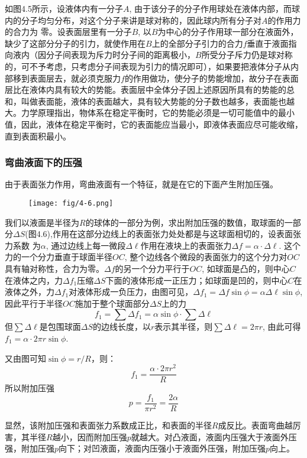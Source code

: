 如图4.5所示，设液体内有一分子$A$, 由于该分子的分子作用球处在液体内部，而球内的分子均匀分布，对这个分子来讲是球对称的，因此球内所有分子对$A$的作用力的合力为
零。设表面层里有一分子$B$, 以$B$为中心的分子作用球一部分在液面外，缺少了这部分分子的引力，就使作用在$B$上的全部分子引力的合力$f$垂直于液面指向液内（因分子间表现为斥力时分子间的距离极小，$B$所受分子斥力仍是球对称的，可不予考虑，只考虑分子间表现为引力的情况即可），如果要把液体分子从内部移到表面层去，就必须克服力$f$的作用做功，使分子的势能增加，故分子在表面层比在液体内具有较大的势能。表面层中全体分子因上述原因所具有的势能的总和，叫做表面能，液体的表面越大，具有较大势能的分子数也越多，表面能也越大。力学原理指出，物体系在稳定平衡时，它的势能必须是一切可能值中的最小值，因此，液体在稳定平衡时，它的表面能应当最小，即液体表面应尽可能收缩，直到表面积最小。

\subsubsection{弯曲液面下的压强}

由于表面张力作用，弯曲液面有一个特征，就是在它的下面产生附加压强。
\begin{figure}[htp]
    \centering
\texttt{[image: fig/4-6.png]}
    \caption{}
\end{figure}

我们以液面是半径为$R$的球体的一部分为例，求出附加压强的数值，取球面的一部分$\Delta S$(图4.6),作用在这部分边线上的表面张力处处都是与这球面相切的，设表面张力系数
为$\alpha$, 通过边线上每一微段$\Delta\ell$作用在液块上的表面张力$\Delta f=\alpha\cdot \Delta\ell$. 这个力的一个分力垂直于球面半径$OC$, 整个边线各个微段的表面张力的这个分力对$OC$具有轴对称性，合力为零。$\Delta f$的另一个分力平行于$OC$, 如球面是凸的，则中心$C$在液体之内，力$\Delta f_1$压缩$\Delta S$下面的液体形成一正压力；如球面是凹的，则中心$C$在液体之外，力$\Delta f_1$对液体形成一负压力，由图可见，$\Delta f_1=\Delta f\sin\phi=\alpha\Delta \ell\sin\phi$, 因此平行于半径$OC$施加于整个球面部分$\Delta S$上的力
\[f_1=\sum \Delta f_1=\alpha\sin\phi\cdot \sum \Delta \ell\]
但$\sum \Delta \ell$是包围球面$\Delta S$的边线长度，以$r$表示其半径，则$\sum \Delta \ell=2\pi r$, 由此可得 $f_1=\alpha\cdot 2\pi r\sin\phi$.

又由图可知$\sin\phi=r/R$，则：
\[f_1=\frac{\alpha\cdot 2\pi r^2}{R}\]
所以附加压强
\[p=\frac{f_1}{\pi r^2}=\frac{2\alpha}{R}\]

显然，该附加压强和表面张力系数成正比，和表面的半径$R$成反比。表面弯曲越厉害，其半径$R$越小，因而附加压强$p$就越大。对凸液面，液面内压强大于液面外压强，附加压强$p$向下；对凹液面，液面内压强小于液面外压强，附加压强$p$向上。

